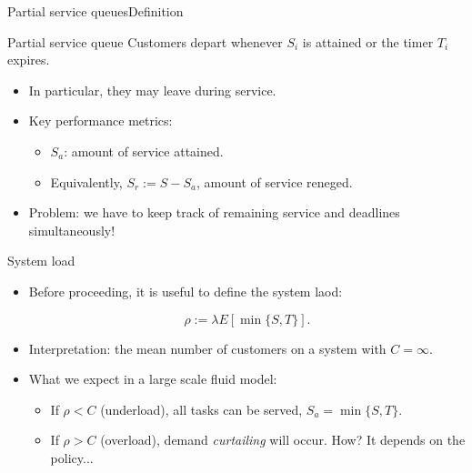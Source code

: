 \documentclass[aspectratio=169]{beamer}
\newenvironment*{myitem}[1][1.5em]{\begin{itemize}\setlength{\itemsep}{#1}}{\end{itemize}}
\begin{document}
\begin{frame}{Partial service queues}{Definition}

	\begin{block}{Partial service queue}
		Customers depart whenever $S_i$ is attained or the timer $T_i$ expires.
	\end{block}
	\vfill

	\pause
	\begin{myitem}
		\item In particular, they may leave \alert{during service}.

		\item Key performance metrics:
		\begin{myitem}[1em]
			\item \alert{$S_a$}: amount of service \alert{attained}.
			\item Equivalently, \alert{$S_r$}$:=S-S_a$, amount of service \alert{reneged}. 
		\end{myitem}

		\pause

		\item \alert{Problem:} we have to keep track of remaining service and deadlines simultaneously!
	\end{myitem}
\end{frame}


\begin{frame}{System load}

	\begin{myitem}
		
	\item Before proceeding, it is useful to define the \alert{system laod}:

	\begin{equation*}
		\rho:= \lambda E[\min\{S,T\}].
	\end{equation*}

	\pause

	\item \alert{Interpretation:} the mean number of customers on a system with $C=\infty$.

	\item What we expect in a large scale fluid model:
	
	\begin{itemize}
	 \item If $\rho<C$ (underload), all tasks can be served, $S_a = \min\{S,T\}$.
	 \item If $\rho>C$ (overload), demand \emph{curtailing} will occur. How? It depends on the policy...
	\end{itemize}

	\end{myitem}


\end{frame}
\end{document}
